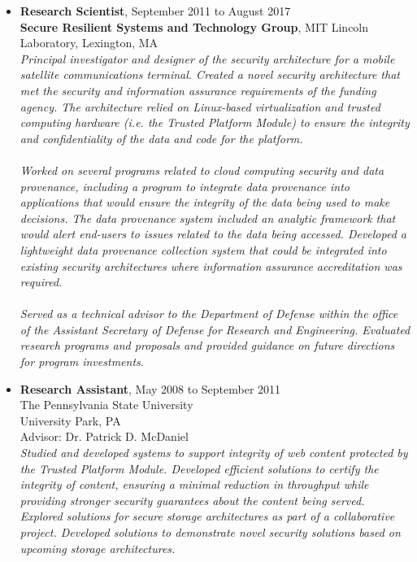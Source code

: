 \documentclass[10pt]{article}
\begin{document}
\begin{itemize}
\item \textbf{Research Scientist}, September 2011 to August 2017\\
  \textbf{Secure Resilient Systems and Technology Group}, MIT Lincoln Laboratory, Lexington, MA\\
\textit{
Principal investigator and designer of the security architecture for a mobile satellite communications terminal. Created a novel security architecture that met the security and information assurance requirements of the funding agency. The architecture relied on Linux-based virtualization and trusted computing hardware (i.e. the Trusted Platform Module) to ensure the integrity and confidentiality of the data and code for the platform.\\
\mbox{}\\
Worked on several programs related to cloud computing security and data provenance, including a program to integrate data provenance into applications that would ensure the integrity of the data being used to make decisions. The data provenance system included an analytic framework that would alert end-users to issues related to the data being accessed. Developed a lightweight data provenance collection system that could be integrated into existing security architectures where information assurance accreditation was required.\\
\mbox{}\\
Served as a technical advisor to the Department of Defense within the office of the Assistant Secretary of Defense for Research and Engineering. Evaluated research programs and proposals and provided guidance on future directions for program investments.}

\item \textbf{Research Assistant}, May 2008 to September 2011\\
  The Pennsylvania State University\\
  University Park, PA\\
  Advisor: Dr. Patrick D. McDaniel\\
  \textit{Studied and developed systems to support integrity of web content protected by the Trusted Platform Module. Developed efficient solutions to certify the integrity of content, ensuring a minimal reduction in throughput while providing stronger security guarantees about the content being served. Explored solutions for secure storage architectures as part of a collaborative project. Developed solutions to demonstrate novel security solutions based on upcoming storage architectures.}


\end{itemize}
\end{document}
